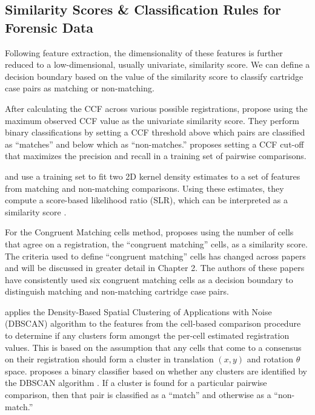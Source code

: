 \documentclass[11pt,]{isuthesis}
\begin{document}
\hypertarget{similarity-scores-classification-rules-for-forensic-data}{%
\subsection{Similarity Scores \& Classification Rules for Forensic Data}\label{similarity-scores-classification-rules-for-forensic-data}}

Following feature extraction, the dimensionality of these features is further reduced to a low-dimensional, usually univariate, similarity score.
We can define a decision boundary based on the value of the similarity score to classify cartridge case pairs as matching or non-matching.

After calculating the CCF across various possible registrations, \citet{tai_fully_2018} propose using the maximum observed CCF value as the univariate similarity score.
They perform binary classifications by setting a CCF threshold above which pairs are classified as ``matches'' and below which as ``non-matches.''
\citet{Tai2019} proposes setting a CCF cut-off that maximizes the precision and recall in a training set of pairwise comparisons.

\citet{Riva2016} and \citet{Riva2020} use a training set to fit two 2D kernel density estimates to a set of features from matching and non-matching comparisons.
Using these estimates, they compute a score-based likelihood ratio (SLR), which can be interpreted as a similarity score \citep{Garton2021}.

For the Congruent Matching cells method, \citet{song_proposed_2013} proposes using the number of cells that agree on a registration, the ``congruent matching'' cells, as a similarity score.
The criteria used to define ``congruent matching'' cells has changed across papers \citep{song_3d_2014, tong_fired_2014, tong_improved_2015, chen_convergence_2017} and will be discussed in greater detail in Chapter 2.
The authors of these papers have consistently used six congruent matching cells as a decision boundary to distinguish matching and non-matching cartridge case pairs.

\citet{zhang_convergence_2021} applies the Density-Based Spatial Clustering of Applications with Noise (DBSCAN) algorithm \citep{Ester1996} to the features from the cell-based comparison procedure to determine if any clusters form amongst the per-cell estimated registration values.
This is based on the assumption that any cells that come to a consensus on their registration should form a cluster in translation \((x,y)\) and rotation \(\theta\) space.
\citet{zhang_convergence_2021} proposes a binary classifier based on whether any clusters are identified by the DBSCAN algorithm \citep{Ester1996}.
If a cluster is found for a particular pairwise comparison, then that pair is classified as a ``match'' and otherwise as a ``non-match.''
\end{document}
